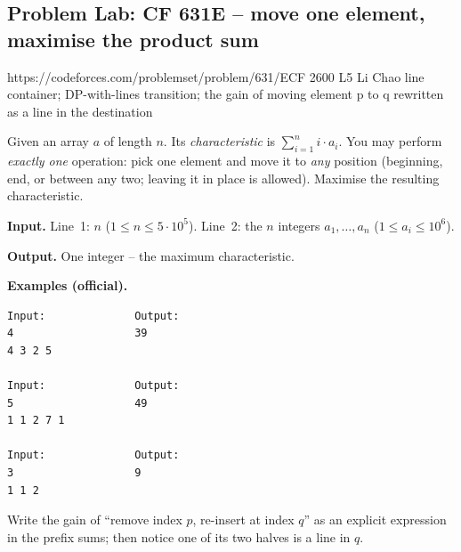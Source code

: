 \subsection{Problem Lab: CF 631E -- move one element, maximise the product sum}

  {https://codeforces.com/problemset/problem/631/E}{CF 2600 L5}
  {Li Chao line container; DP-with-lines transition; the gain of moving element p to q rewritten as a line in the destination}

\begin{problemstatement}
Given an array \(a\) of length \(n\). Its \emph{characteristic} is
\(\sum_{i=1}^{n} i\cdot a_i\). You may perform \emph{exactly one} operation: pick
one element and move it to \emph{any} position (beginning, end, or between any two;
leaving it in place is allowed). Maximise the resulting characteristic.

\textbf{Input.} Line~1: \(n\) (\(1\le n\le 5\cdot10^{5}\)).  Line~2: the
\(n\) integers \(a_1,\dots,a_n\) (\(1\le a_i\le 10^{6}\)).

\textbf{Output.} One integer -- the maximum characteristic.

\textbf{Examples (official).}
\begin{verbatim}
Input:              Output:
4                   39
4 3 2 5

Input:              Output:
5                   49
1 1 2 7 1

Input:              Output:
3                   9
1 1 2
\end{verbatim}
\end{problemstatement}

\begin{attemptgate}
Write the gain of ``remove index \(p\), re-insert at index \(q\)'' as an explicit
expression in the prefix sums; then notice one of its two halves is a
line in \(q\).
\end{attemptgate}

